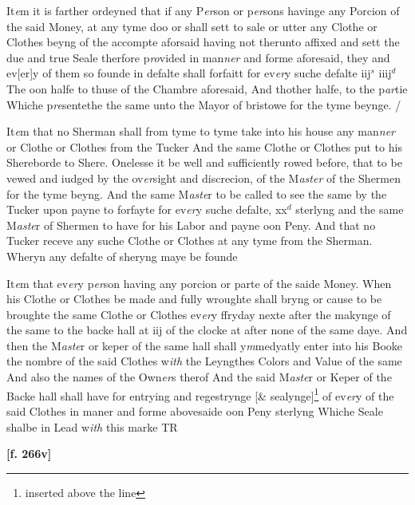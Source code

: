 \documentclass[a4paper,12pt]{article}
\begin{document}
It\textit{e}m it is farther ordeyned that if any P\textit{er}son or p\textit{er}sons havinge any Porcion of the said Money, at any tyme doo or shall sett to sale or utter any Clothe or Clothes beyng of the accompte aforsaid having not therunto affixed and sett the due and true Seale therfore p\textit{ro}vided in man\textit{ner} and forme aforesaid, they and ev[er]y of them so founde in defalte shall forfaitt for ev\textit{er}y suche defalte iij$^{s}$ iiij$^{d}$  The oon halfe to thuse of the Chambre aforesaid, And thother halfe, to the p\textit{ar}tie Whiche p\textit{re}sentethe the same unto the Mayor of bristowe for the tyme beynge. /

It\textit{e}m that no Sherman shall from tyme to tyme take into his house any man\textit{ner} or Clothe or Clothes from the Tucker And the same Clothe or Clothes put to his Shereborde to Shere. Onelesse it be well and sufficiently rowed before, that to be vewed and iudged by the ov\textit{er}sight and discrecion, of the M\textit{aster} of the Shermen for the tyme beyng. And the same M\textit{aste}r to be called to see the same by the Tucker upon payne to forfayte for ev\textit{er}y suche defalte, xx$^{d}$ sterlyng and the same M\textit{aste}r of Shermen to have for his Labor and payne oon Peny. And that no Tucker receve any suche Clothe or Clothes at any tyme from the Sherman. Wheryn any defalte of sheryng maye be founde

It\textit{e}m that ev\textit{er}y p\textit{er}son having any porcion or parte of the saide Money. When his Clothe or Clothes be made and fully wroughte shall bryng or cause to be broughte the same Clothe or Clothes ev\textit{er}y ffryday nexte after the makynge of the same to the backe hall at iij of the clocke at after none of the same daye. And then the M\textit{aste}r or keper of the same hall shall y\textit{m}medyatly enter into his Booke the nombre of the said Clothes w\textit{ith} the Leyngthes Colors and Value of the same And also the names of the Own\textit{er}s therof And the said M\textit{aste}r or Keper of the Backe hall shall have for entrying and regestrynge [\& sealynge]\footnote{inserted above the line} of ev\textit{er}y of the said Clothes in maner and forme abovesaide oon Peny sterlyng  Whiche Seale shalbe in Lead w\textit{ith} this marke TR

\textbf{[f. 266v]}
\end{document}
